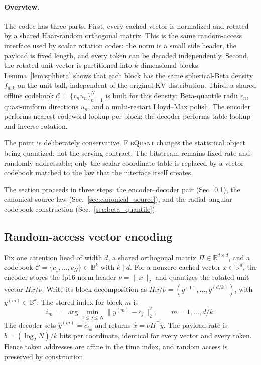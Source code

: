 \documentclass{article}
\theoremstyle{definition}
\theoremstyle{remark}
\newcommand{\bbR}{\mathbb{R}}
\newcommand{\bbB}{\mathbb{B}}
\begin{document}
\paragraph{Overview.}
The codec has three parts.  First, every cached vector is
normalized and rotated by a shared Haar-random orthogonal matrix.
This is the same random-access interface used by scalar rotation
codes: the norm is a small side header, the payload is fixed length,
and every token can be decoded independently.  Second, the rotated
unit vector is partitioned into $k$-dimensional blocks.
Lemma~\ref{lem:sphbeta} shows that each block has the same
spherical-Beta density $f_{d, k}$ on the unit ball, independent of
the original KV distribution.  Third, a shared offline codebook
$\mathcal{C} = \{r_n u_n\}_{n = 1}^{N}$ is built for this density:
Beta-quantile radii $r_n$, quasi-uniform directions $u_n$, and a
multi-restart Lloyd--Max polish.  The encoder performs
nearest-codeword lookup per block; the decoder performs table lookup
and inverse rotation.

The point is deliberately conservative.  \textsc{FibQuant} changes
the statistical object being quantized, not the serving contract.
The bitstream remains fixed-rate and randomly addressable; only the
scalar coordinate table is replaced by a vector codebook matched to
the law that the interface itself creates.

The section proceeds in three steps: the encoder--decoder pair
(Sec.~\ref{sec:rand_access}), the canonical source law
(Sec.~\ref{sec:canonical_source}), and the radial--angular codebook
construction (Sec.~\ref{sec:beta_quantile}).

\subsection{Random-access vector encoding}
\label{sec:rand_access}

Fix one attention head of width $d$, a shared orthogonal matrix
$\Pi \in \bbR^{d \times d}$, and a codebook
$\mathcal{C} = \{c_1, \ldots, c_N\} \subset \bbB^k$ with $k \mid d$.
For a nonzero cached vector $x \in \bbR^d$, the encoder stores the
fp16 norm header $\nu = \|x\|_2$ and quantizes the rotated unit
vector $\Pi x / \nu$.  Write its block decomposition as $\Pi x / \nu
= (y^{(1)}, \ldots, y^{(d/k)})$, with $y^{(m)} \in \bbB^k$.  The
stored index for block $m$ is
\begin{equation}
i_m \;=\; \arg\min_{1 \leq j \leq N} \|y^{(m)} - c_j\|_2^2,
\qquad m = 1, \ldots, d/k.
\label{eq:encode}
\end{equation}
The decoder sets $\hat y^{(m)} = c_{i_m}$ and returns
$\hat x = \nu \Pi^\top \hat y$.  The payload rate is
$b = (\log_2 N)/k$ bits per coordinate, identical for every vector
and every token.  Hence token addresses are affine in the time
index, and random access is preserved by construction.
\end{document}
